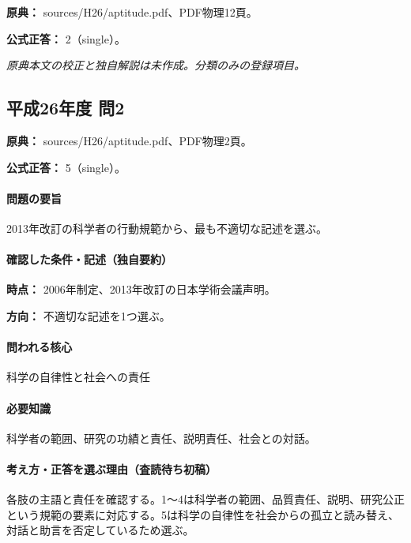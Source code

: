 \noindent\textbf{原典：} sources/H26/aptitude.pdf、PDF物理12頁。

\textbf{公式正答：} 2（single）。

\par\textit{原典本文の校正と独自解説は未作成。分類のみの登録項目。}

\subsection{平成26年度 問2}
\label{q:h26-reg-apt-02}

\noindent\textbf{原典：} sources/H26/aptitude.pdf、PDF物理2頁。

\textbf{公式正答：} 5（single）。

\paragraph{問題の要旨} 2013年改訂の科学者の行動規範から、最も不適切な記述を選ぶ。

\paragraph{確認した条件・記述（独自要約）}\mbox{}\par

\noindent\textbf{時点：} 2006年制定、2013年改訂の日本学術会議声明。\par

\noindent\textbf{方向：} 不適切な記述を1つ選ぶ。\par

\paragraph{問われる核心} 科学の自律性と社会への責任

\paragraph{必要知識} 科学者の範囲、研究の功績と責任、説明責任、社会との対話。

\paragraph{考え方・正答を選ぶ理由（査読待ち初稿）} 各肢の主語と責任を確認する。1〜4は科学者の範囲、品質責任、説明、研究公正という規範の要素に対応する。5は科学の自律性を社会からの孤立と読み替え、対話と助言を否定しているため選ぶ。

